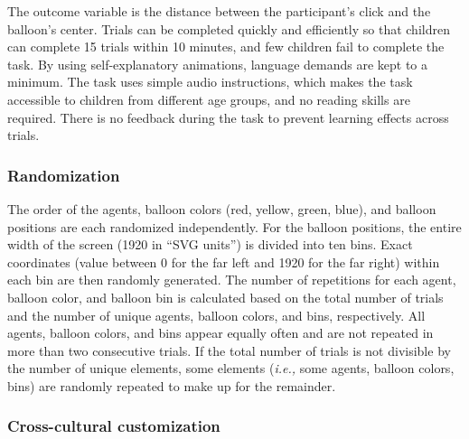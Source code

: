 \documentclass[
  man,floatsintext]{apa7}
\begin{document}
The outcome variable is the distance between the participant's click and the balloon's center.
Trials can be completed quickly and efficiently so that children can complete 15 trials within 10 minutes, and few children fail to complete the task.
By using self-explanatory animations, language demands are kept to a minimum.
The task uses simple audio instructions, which makes the task accessible to children from different age groups, and no reading skills are required.
There is no feedback during the task to prevent learning effects across trials.

\subsubsection{Randomization}\label{randomization}

The order of the agents, balloon colors (red, yellow, green, blue), and balloon positions are each randomized independently.
For the balloon positions, the entire width of the screen (1920 in ``SVG units'') is divided into ten bins.
Exact coordinates (value between 0 for the far left and 1920 for the far right) within each bin are then randomly generated.
The number of repetitions for each agent, balloon color, and balloon bin is calculated based on the total number of trials and the number of unique agents, balloon colors, and bins, respectively.
All agents, balloon colors, and bins appear equally often and are not repeated in more than two consecutive trials.
If the total number of trials is not divisible by the number of unique elements, some elements (\emph{i.e.,} some agents, balloon colors, bins) are randomly repeated to make up for the remainder.

\subsubsection{Cross-cultural customization}\label{cross-cultural-customization}
\end{document}
